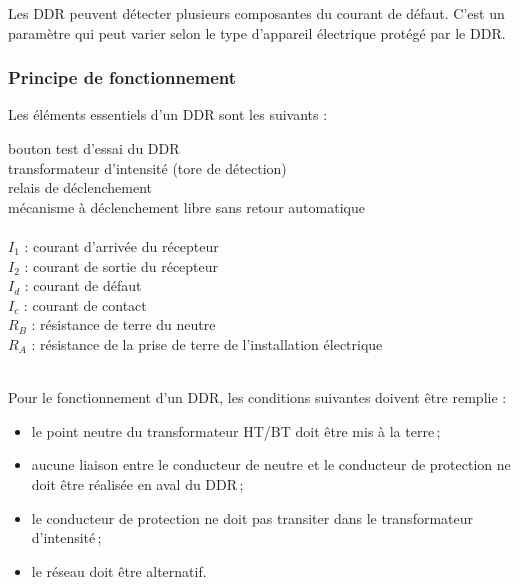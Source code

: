 Les DDR peuvent détecter plusieurs composantes du courant de défaut. C'est un paramètre qui peut varier selon le type d'appareil électrique protégé par le DDR.



\subsubsection{Principe de fonctionnement\label{subsubsec:principe_fonctionnement_ddr}}

Les éléments essentiels d'un DDR sont les suivants : \\
\begin{minipage}{\linewidth} %
	\begin{multicols}{2} %
	\startcstep %
		 bouton test d'essai du DDR\\ %
		 transformateur d'intensité (tore de détection)\\
		 relais de déclenchement  \\
		 mécanisme à déclenchement libre sans retour automatique \\
		\columnbreak\\ %
		$I_1$ : courant \og d'arrivée \fg{} du récepteur \\
		$I_2$ : courant \og de sortie \fg{} du récepteur \\
		$I_d$ : courant de défaut\\
		$I_c$ : courant de contact\\
		$R_B$ : résistance de terre du neutre\\
		$R_A$ : résistance de la prise de terre de l'installation électrique 
	\end{multicols}
\end{minipage}
~\\
Pour le fonctionnement d'un DDR, les conditions suivantes doivent être remplie :
\begin{itemize}
\item le point neutre du transformateur HT/BT doit être mis à la terre\,;
\item aucune liaison entre le conducteur de neutre et le conducteur de protection ne doit être réalisée en aval du DDR\,;
\item le conducteur de protection ne doit pas transiter dans le transformateur d'intensité\,;
\item le réseau doit être alternatif.
\end{itemize}

